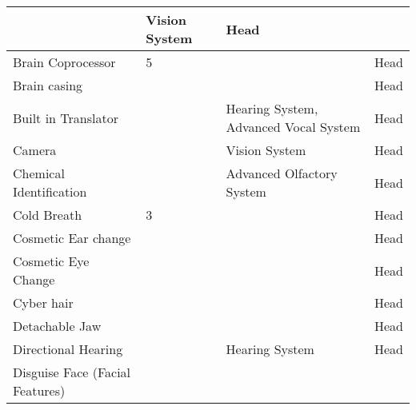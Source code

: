 \documentclass[twoside]{book}
\begin{document}
\begin{longtable}{p{1.25in}p{2em}ll}
  &
   Vision System 
  &
   Head 
  \tabularnewline
  \hline
      
  \raggedright
           Brain Coprocessor 
  &
   5 
  &
  
  &
   Head 
  \tabularnewline
  \hline
      
  \raggedright
           Brain casing 
  &
  
  &
  
  &
   Head 
  \tabularnewline
  \hline
      
  \raggedright
           Built in Translator 
  &
  
  &
   Hearing System,
           Advanced Vocal System 
  &
   Head 
  \tabularnewline
  \hline
      
  \raggedright
           Camera 
  &
  
  &
   Vision System 
  &
   Head 
  \tabularnewline
  \hline
      
  \raggedright
           Chemical Identification
           
  &
  
  &
   Advanced Olfactory
           System 
  &
   Head 
  \tabularnewline
  \hline
      
  \raggedright
           Cold Breath 
  &
   3 
  &
  
  &
   Head 
  \tabularnewline
  \hline
      
  \raggedright
           Cosmetic Ear change 
  &
  
  &
  
  &
   Head 
  \tabularnewline
  \hline
      
  \raggedright
           Cosmetic Eye Change 
  &
  
  &
  
  &
   Head 
  \tabularnewline
  \hline
      
  \raggedright
           Cyber hair 
  &
  
  &
  
  &
   Head 
  \tabularnewline
  \hline
      
  \raggedright
           Detachable Jaw 
  &
  
  &
  
  &
   Head 
  \tabularnewline
  \hline
      
  \raggedright
           Directional Hearing 
  &
  
  &
   Hearing System 
  &
   Head 
  \tabularnewline
  \hline
      
  \raggedright
           Disguise Face (Facial Features)
           

\end{longtable}
\end{document}
